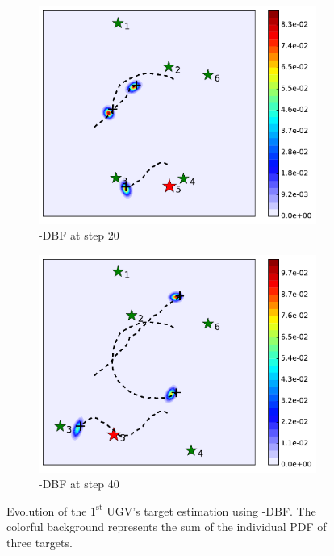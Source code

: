\begin{figure}
\begin{subfigure}[b]{0.23\textwidth}
			\includegraphics[width=\textwidth]{figures/dbf_hetero_mov_sen_mov_tar_rbt5_step20}
			\caption{\proto-DBF at step 20}\label{fig:step20}
		\end{subfigure}	
		\begin{subfigure}[b]{0.23\textwidth}
			\includegraphics[width=\textwidth]{figures/dbf_hetero_mov_sen_mov_tar_rbt5_step40}
			\caption{\proto-DBF at step 40}\label{fig:step40}
		\end{subfigure}			
		\caption{Evolution of the $1^\text{st}$ UGV's target estimation using \proto-DBF. The colorful background represents the sum of the individual PDF of three targets.}
		\label{fig:mov_sen_mov_tar1}
	\end{figure}
	
